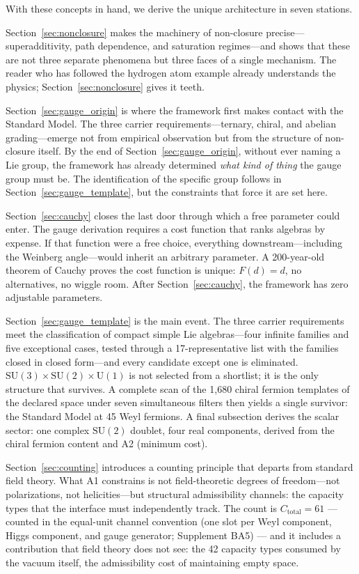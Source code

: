 \documentclass[11pt]{article}
\newcommand{\SU}{\mathrm{SU}}
\newcommand{\U}{\mathrm{U}}
\begin{document}
With these concepts in hand, we derive the unique architecture in seven stations.

Section~\ref{sec:nonclosure} makes the machinery of non-closure precise---superadditivity, path dependence, and saturation regimes---and shows that these are not three separate phenomena but three faces of a single mechanism.  The reader who has followed the hydrogen atom example already understands the physics; Section~\ref{sec:nonclosure} gives it teeth.

Section~\ref{sec:gauge_origin} is where the framework first makes contact with the Standard Model.  The three carrier requirements---ternary, chiral, and abelian grading---emerge not from empirical observation but from the structure of non-closure itself.  By the end of Section~\ref{sec:gauge_origin}, without ever naming a Lie group, the framework has already determined \emph{what kind of thing} the gauge group must be.  The identification of the specific group follows in Section~\ref{sec:gauge_template}, but the constraints that force it are set here.

Section~\ref{sec:cauchy} closes the last door through which a free parameter could enter.  The gauge derivation requires a cost function that ranks algebras by expense.  If that function were a free choice, everything downstream---including the Weinberg angle---would inherit an arbitrary parameter.  A 200-year-old theorem of Cauchy proves the cost function is unique: $F(d) = d$, no alternatives, no wiggle room.  After Section~\ref{sec:cauchy}, the framework has zero adjustable parameters.

Section~\ref{sec:gauge_template} is the main event.  The three carrier requirements meet the classification of compact simple Lie algebras---four infinite families and five exceptional cases, tested through a 17-representative list with the families closed in closed form---and every candidate except one is eliminated.  $\SU(3) \times \SU(2) \times \U(1)$ is not selected from a shortlist; it is the only structure that survives.  A complete scan of the 1{,}680 chiral fermion templates of the declared space under seven simultaneous filters then yields a single survivor: the Standard Model at 45 Weyl fermions.  A final subsection derives the scalar sector: one complex $\SU(2)$ doublet, four real components, derived from the chiral fermion content and A2 (minimum cost).

Section~\ref{sec:counting} introduces a counting principle that departs from standard field theory.  What A1 constrains is not field-theoretic degrees of freedom---not polarizations, not helicities---but structural admissibility channels: the capacity types that the interface must independently track.  The count is $C_{\mathrm{total}} = 61$ --- counted in the equal-unit channel convention (one slot per Weyl component, Higgs component, and gauge generator; Supplement BA5) --- and it includes a contribution that field theory does not see: the 42 capacity types consumed by the vacuum itself, the admissibility cost of maintaining empty space.
\end{document}
